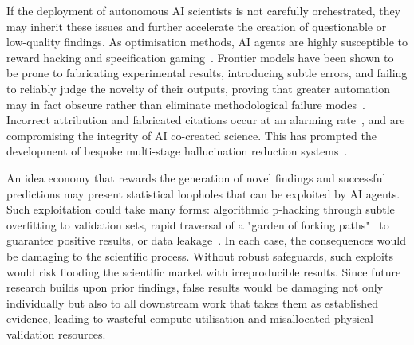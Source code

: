 \documentclass[11pt, a4paper, twocolumn, goog]{google}
\begin{document}
If the deployment of autonomous AI scientists is not carefully orchestrated, they may inherit these issues and further accelerate the creation of questionable or low-quality findings. As optimisation methods, AI agents are highly susceptible to reward hacking and specification gaming~\citep{amodei2016concrete, skalse2022defining}. Frontier models have been shown to be prone to fabricating experimental results, introducing subtle errors, and failing to reliably judge the novelty of their outputs, proving that greater automation may in fact obscure rather than eliminate methodological failure modes~\citep{kong2026aiautoresearchroadmap}. Incorrect attribution and fabricated citations occur at an alarming rate~\citep{walters2023fabrication, topaz2026fabricated}, and are compromising the integrity of AI co-created science. This has prompted the development of bespoke multi-stage hallucination reduction systems~\citep{sabharwal2026vaas}.

An idea economy that rewards the generation of novel findings and successful predictions may present statistical loopholes that can be exploited by AI agents. Such exploitation could take many forms: algorithmic p-hacking through subtle overfitting to validation sets, rapid traversal of a "garden of forking paths"~\citep{gelman2013garden, kale2019decision} to guarantee positive results, or data leakage~\citep{kapoor2023leakage}. In each case, the consequences would be damaging to the scientific process. Without robust safeguards, such exploits would risk flooding the scientific market with irreproducible results. Since future research builds upon prior findings, false results would be damaging not only individually but also to all downstream work that takes them as established evidence, leading to wasteful compute utilisation and misallocated physical validation resources.
\end{document}
